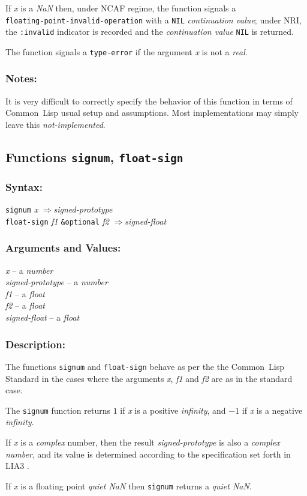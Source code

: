 \documentclass[10pt,fleqn]{article}
\newcommand{\CL}{\textsf{Common~Lisp}}
\newcommand{\code}[1]{\texttt{#1}}
\newcommand{\clieeeterm}[1]{\textit{#1}}
\newcommand{\clliaterm}[1]{\textit{#1}}
\newcommand{\varname}[1]{\textit{#1}}
\newcommand{\clterm}[1]{\textit{#1}}
\newcommand{\RArrow}{$\Rightarrow$}
\newcommand{\DDictionaryItem}[1]{\vspace*{6pt}\noindent\hrulefill\vspace*{-9pt}\subsection*{#1}}
\newcommand{\DSyntax}{\subsubsection*{Syntax:}}
\newcommand{\DArgsNValues}{\subsubsection*{Arguments and Values:}}
\newcommand{\DDescription}{\subsubsection*{Description:}}
\newcommand{\DNotes}{\subsubsection*{Notes:}}
\begin{document}
If \varname{x} is a \clieeeterm{NaN} then, under NCAF regime, the
function signals a\\
\code{floating-point-invalid-operation} with a
\code{NIL} \clieeeterm{continuation value}; under NRI, the
\code{:invalid} indicator is recorded and the \clieeeterm{continuation
  value} \code{NIL} is returned.

The function signals a \code{type-error} if the argument \varname{x}
is not a \clterm{real}.

\DNotes{}

It is very difficult to correctly specify the behavior of this function
in terms of \CL{} usual setup and assumptions.  Most implementations
may simply leave this \clliaterm{not-implemented}.


\DDictionaryItem{Functions \code{signum}, \code{float-sign}}
\index{S!\code{signum}}
\index{F!\code{float-sign}}


\DSyntax{}

\code{signum} \varname{x} \RArrow \varname{signed-prototype}\\
\code{float-sign} \varname{f1} \code{\&optional} \varname{f2}
\RArrow \varname{signed-float}


\DArgsNValues{}

\varname{x} -- a \clterm{number}\\
\varname{signed-prototype} -- a \clterm{number}\\
\varname{f1} -- a \clterm{float}\\
\varname{f2} -- a \clterm{float}\\
\varname{signed-float} -- a \clterm{float}


\DDescription{}

The functions \code{signum} and \code{float-sign} behave as per the
the \CL{} Standard \cite{1994:ANSICL} in the cases where the arguments
\varname{x}, \varname{f1} and \varname{f2} are as in the standard case.

The \code{signum} function returns $1$ if \varname{x} is a positive
\clliaterm{infinity}, and  $-1$ if \varname{x} is a negative
\clliaterm{infinity}.

If \varname{x} is a \clterm{complex} number, then the result
\varname{signed-prototype} is also a \clterm{complex number}, and its
value is determined according to the specification set forth in LIA3
\cite{2004:LIA3}.

If \varname{x} is a floating point \clliaterm{quiet NaN} then
\code{signum} returns a \clliaterm{quiet NaN}.
\end{document}
